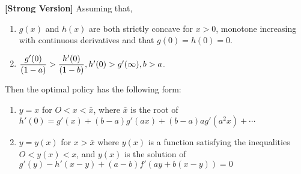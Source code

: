 \begin{theorem}
    \textbf{[Strong Version]} Assuming that,
    \begin{enumerate}
        \item $g(x)$ and $h(x)$ are both strictly concave for $x > 0$, monotone increasing with continuous derivatives and that $g(0) = h(0) = 0$.
        \item $\mathlarger{\frac{g'(0)}{(1 - a)} > \frac{h'(0)}{(1 - b)}}, h'(0) > g'(\infty), b > a$.
    \end{enumerate}
    Then the optimal policy has the following form:
    \begin{enumerate}
        \item $y=x$ for $O<x<\bar{x}$, where $\bar{x}$ is the root of $h'(0)=g'(x)+(b-a)g'(ax)+(b-a)ag'(a^2x) +\cdots$
        \item $y=y(x)$ for $x > \bar{x}$ where $y(x)$ is a function satisfying the inequalities $O < y(x) < x$, and $y(x)$ is the solution of $\boxed{g'(y)-h'(x-y)+(a-b)f'(ay+b(x-y))=0}$
    \end{enumerate}
\end{theorem}

